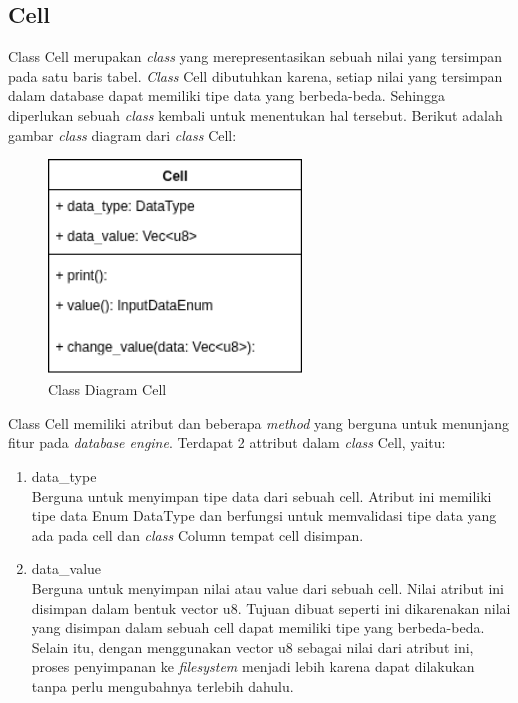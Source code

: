 \subsection{Cell}
Class Cell merupakan \emph{class} yang merepresentasikan sebuah nilai yang tersimpan pada satu baris tabel. \emph{Class} Cell dibutuhkan karena, setiap nilai yang tersimpan dalam database
dapat memiliki tipe data yang berbeda-beda. Sehingga diperlukan sebuah \emph{class} kembali untuk menentukan hal tersebut. Berikut adalah gambar \emph{class} diagram dari \emph{class} Cell:
\begin{figure}[H]
  \centering{}
	\includegraphics[width=0.6\textwidth]{gambar/bab4/Cell}
  \caption{Class Diagram Cell}
\end{figure}

Class Cell memiliki atribut dan beberapa \emph{method} yang berguna untuk menunjang fitur pada \emph{database engine}. Terdapat 2 attribut dalam \emph{class} Cell, yaitu:
\begin{enumerate}
	\item data\_type \\
	Berguna untuk menyimpan tipe data dari sebuah cell. Atribut ini memiliki tipe data Enum DataType dan berfungsi untuk memvalidasi tipe data yang ada pada cell
  dan \emph{class} Column tempat cell disimpan.  

	\item data\_value \\
	Berguna untuk menyimpan nilai atau value dari sebuah cell. Nilai atribut ini disimpan dalam bentuk vector u8. Tujuan dibuat seperti ini dikarenakan nilai yang disimpan
  dalam sebuah cell dapat memiliki tipe yang berbeda-beda.  Selain itu, dengan menggunakan vector u8 sebagai nilai dari atribut ini, proses penyimpanan ke \emph{filesystem} menjadi lebih
  karena dapat dilakukan tanpa perlu mengubahnya terlebih dahulu. 
\end{enumerate}

